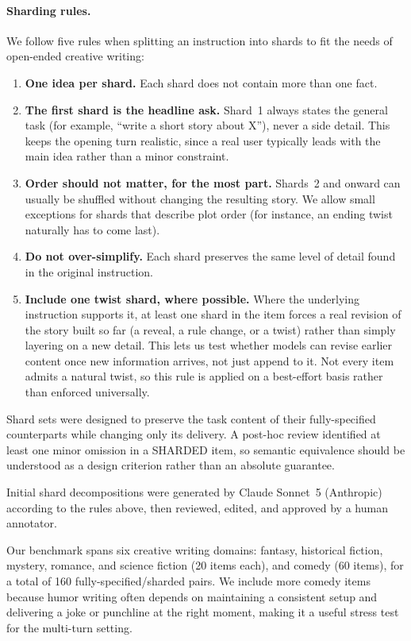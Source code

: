 \paragraph{Sharding rules.} We follow five rules when splitting an instruction into shards to fit the needs of open-ended creative writing:

\begin{enumerate}
    \item \textbf{One idea per shard.} Each shard does not contain more than one fact.
    \item \textbf{The first shard is the headline ask.} Shard~1 always states the general task (for example, ``write a short story about X''), never a side detail. This keeps the opening turn realistic, since a real user typically leads with the main idea rather than a minor constraint.
    \item \textbf{Order should not matter, for the most part.} Shards~2 and onward can usually be shuffled without changing the resulting story. We allow small exceptions for shards that describe plot order (for instance, an ending twist naturally has to come last).
    \item \textbf{Do not over-simplify.} Each shard preserves the same level of detail found in the original instruction.
    \item \textbf{Include one twist shard, where possible.} Where the underlying instruction supports it, at least one shard in the item forces a real revision of the story built so far (a reveal, a rule change, or a twist) rather than simply layering on a new detail. This lets us test whether models can revise earlier content once new information arrives, not just append to it. Not every item admits a natural twist, so this rule is applied on a best-effort basis rather than enforced universally.
\end{enumerate}

Shard sets were designed to preserve the task content of their fully-specified counterparts while changing only its delivery. A post-hoc review identified at least one minor omission in a SHARDED item, so semantic equivalence should be understood as a design criterion rather than an absolute guarantee.

Initial shard decompositions were generated by Claude Sonnet~5 (Anthropic) according to the rules above, then reviewed, edited, and approved by a human annotator.

Our benchmark spans six creative writing domains: fantasy, historical fiction, mystery, romance, and science fiction (20 items each), and comedy (60 items), for a total of 160 fully-specified/sharded pairs. We include more comedy items because humor writing often depends on maintaining a consistent setup and delivering a joke or punchline at the right moment, making it a useful stress test for the multi-turn setting.


